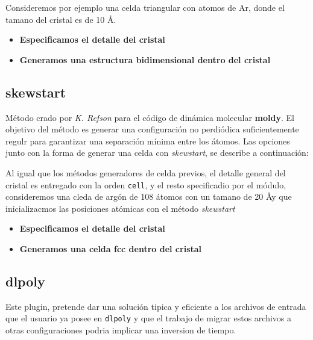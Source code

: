 Consideremos por ejemplo una celda triangular con atomos de Ar, donde el tamano del cristal es de 10 \AA.

\begin{itemize}
 \item \textbf{Especificamos el detalle del cristal}
 \item \textbf{Generamos una estructura bidimensional dentro del cristal}
\end{itemize}

\subsection{skewstart}
M\'etodo crado por \textit{K. Refson} para el c\'odigo de din\'amica molecular \textbf{moldy}. El objetivo del m\'etodo es generar una configuraci\'on no perdi\'odica suficientemente regulr para garantizar una separaci\'on m\'inima entre los \'atomos. Las opciones junto con la forma de generar una celda con \textit{skewstart}, se describe a continuaci\'on:


Al igual que los m\'etodos generadores de celda previos, el detalle general del cristal es entregado con la orden \verb|cell|, y el resto specificadio por el m\'odulo, consideremos una cleda de arg\'on de 108 \'atomos con un tamano de 20 \AA y que inicializacmos las posiciones at\'omicas con el m\'etodo \textit{skewstart}

\begin{itemize}
 \item \textbf{Especificamos el detalle del cristal}
 \item \textbf{Generamos una celda  fcc dentro del cristal}
\end{itemize}

\subsection{dlpoly}
Este plugin, pretende dar una soluci\'on tipica y eficiente a los archivos de entrada que el usuario ya posee en \verb|dlpoly| y que el trabajo de migrar estos archivos a otras configuraciones podria implicar una inversion de tiempo.

